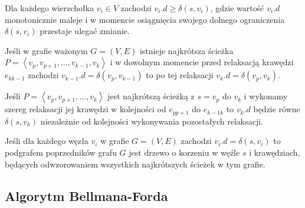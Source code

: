 \begin{lemma}\label{lem:costUpperBound}
Dla każdego wierzchołka $v_{i} \in V$ zachodzi $ v_{i}.d \geqslant \delta \left( s , v_{i} \right)$, gdzie wartość $v_{i}.d$ monotonicznie maleje i w momencie osiągnięcia swojego dolnego ograniczenia $\delta \left( s , v_{i} \right)$ przestaje ulegać zmianie.
\end{lemma}

\begin{lemma}\label{lem:convergenceProperty}
Jeśli w grafie ważonym $G = \left( V, E \right)$ istnieje najkrótsza ścieżka $P = \left \langle v_{p}, v_{p+1}, \ldots, v_{k-1}, v_{k} \right \rangle $ i w dowolnym momencie przed relaksacją krawędzi $e_{kk-1}$ zachodzi $ v_{k-1}.d = \delta \left( v_{p}, v_{k-1} \right)$ to po tej relaksacji $ v_{k}.d = \delta \left( v_{p}, v_{k} \right)$.
\end{lemma}

\begin{lemma}\label{lem:pathRelaxation}
Jeśli $P = \left \langle v_{p}, v_{p+1}, \ldots, v_{k} \right \rangle $ jest najkrótszą ścieżką z $s = v_{p}$ do $v_{k}$ i wykonamy szereg relaksacji jej krawędzi w kolejności od $e_{pp+1}$ do $e_{k-1k}$ to $v_{k}.d$ będzie równe $ \delta \left( s, v_{k}\right)$ niezależnie od kolejności wykonywania pozostałych relaksacji.
\end{lemma}

\begin{lemma}\label{lem:parentSubgraph}
Jeśli dla każdego węzła $v_{i}$ w grafie $G = \left( V, E \right)$ zachodzi $v_{i}.d = \delta \left( s, v_{i} \right)$ to podgrafem poprzedników grafu $G$ jest drzewo o korzeniu w węźle $s$ i krawędziach, będących odwzorowaniem wszystkich najkrótszych ścieżek w tym grafie.
\end{lemma}

\subsection{Algorytm Bellmana-Forda}

